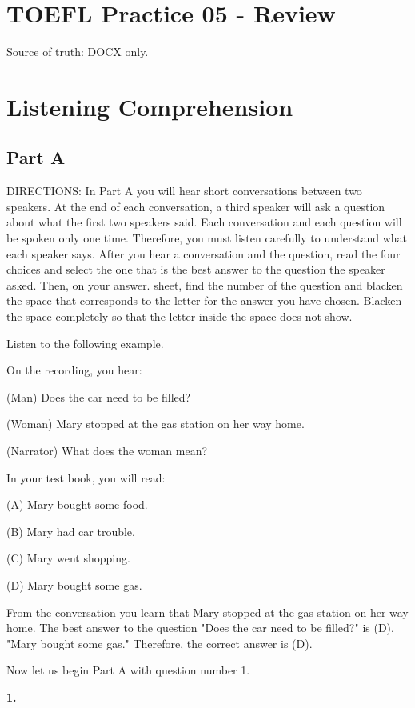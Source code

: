 \documentclass[12pt]{article}
\begin{document}
\section*{TOEFL Practice 05 - Review}
Source of truth: DOCX only.
\section*{Listening Comprehension}
\subsection*{Part A}
DIRECTIONS: In Part A you will hear short conversations between two speakers. At the end of each conversation, a third speaker will ask a question about what the first two speakers said. Each conversation and each question will be spoken only one time. Therefore, you must listen carefully to understand what each speaker says. After you hear a conversation and the question, read the four choices and select the one that is the best answer to the question the speaker asked. Then, on your answer. sheet, find the number of the question and blacken the space that corresponds to the letter for the answer you have chosen. Blacken the space completely so that the letter inside the space does not show.\par
\begin{exampleblock}
Listen to the following example.\par
On the recording, you hear:\par
(Man) Does the car need to be filled?\par
(Woman) Mary stopped at the gas station on her way home.\par
(Narrator) What does the woman mean?\par
In your test book, you will read:\par
(A) Mary bought some food.\par
(B) Mary had car trouble.\par
(C) Mary went shopping.\par
(D) Mary bought some gas.\par
From the conversation you learn that Mary stopped at the gas station on her way home. The best answer to the question "Does the car need to be filled?" is (D), "Mary bought some gas." Therefore, the correct answer is (D).\par
Now let us begin Part A with question number 1.\par
\end{exampleblock}
\noindent\textbf{1.}
\end{document}
